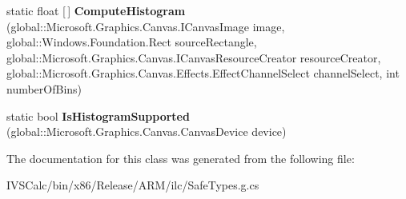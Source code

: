 \begin{DoxyCompactItemize}
\item 
\mbox{\label{class_microsoft_1_1_graphics_1_1_canvas_1_1_canvas_image_ac93dfecc525eae062c86e25f3af30682}} 
static float \mbox{[}$\,$\mbox{]} {\bfseries Compute\+Histogram} (global\+::\+Microsoft.\+Graphics.\+Canvas.\+I\+Canvas\+Image image, global\+::\+Windows.\+Foundation.\+Rect source\+Rectangle, global\+::\+Microsoft.\+Graphics.\+Canvas.\+I\+Canvas\+Resource\+Creator resource\+Creator, global\+::\+Microsoft.\+Graphics.\+Canvas.\+Effects.\+Effect\+Channel\+Select channel\+Select, int number\+Of\+Bins)
\item 
\mbox{\label{class_microsoft_1_1_graphics_1_1_canvas_1_1_canvas_image_aff3e5210428f12ae587c08a1c3b26c85}} 
static bool {\bfseries Is\+Histogram\+Supported} (global\+::\+Microsoft.\+Graphics.\+Canvas.\+Canvas\+Device device)
\end{DoxyCompactItemize}


The documentation for this class was generated from the following file\+:\begin{DoxyCompactItemize}
\item 
I\+V\+S\+Calc/bin/x86/\+Release/\+A\+R\+M/ilc/Safe\+Types.\+g.\+cs\end{DoxyCompactItemize}
